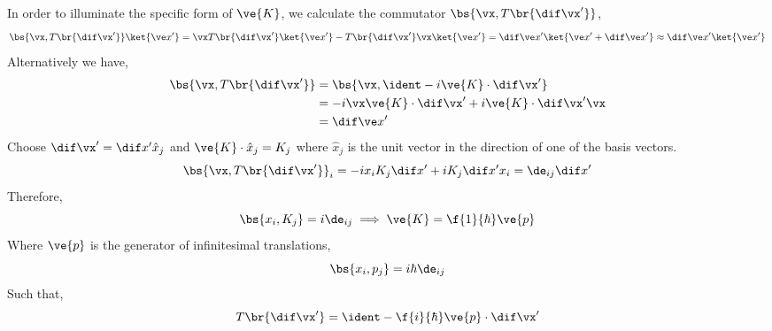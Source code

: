 \documentclass{article}
\begin{document}
In order to illuminate the specific form of $\ve{K}$, we calculate the commutator $\bs{\vx, T\br{\dif \vx'}}$,
\[ \bs{\vx, T\br{\dif \vx'}}\ket{\ve x'} = \vx T\br{\dif \vx'}\ket{\ve x'} - T\br{\dif \vx'}\vx\ket{\ve x'} = \dif \ve x' \ket{\ve x' + \dif \ve x'} \approx \dif \ve x' \ket{\ve x'}\]
Alternatively we have,
\begin{align*}
\bs{\vx, T\br{\dif \vx'}} &= \bs{\vx, \ident - i \ve{K}\cdot\dif\vx'} \\
&= -i \vx \ve{K} \cdot \dif \vx' + i \ve{K} \cdot \dif \vx' \vx \\
&= \dif \ve x'
\end{align*}
Choose $\dif \vx' = \dif x' \hat{x}_j$ and $\ve{K} \cdot \hat{x}_j = K_j$ where $\hat{x}_j$ is the unit vector in the direction of one of the basis vectors.
\[ \bs{\vx, T\br{\dif \vx'}}_i = -i x_i K_j \dif x' + i K_j \dif x' x_i = \de_{ij} \dif x'\]
Therefore,
\[ \bs{x_i, K_j} = i \de_{ij} \implies \ve{K} = \f{1}{\hbar} \ve{p} \]
Where $\ve{p}$ is the generator of infinitesimal translations,
\[ \bs{x_i, p_j} = i \hbar \de_{ij} \]
Such that,
\[ T\br{\dif \vx'} = \ident - \f{i}{\hbar} \ve{p} \cdot \dif \vx' \]
\end{document}
